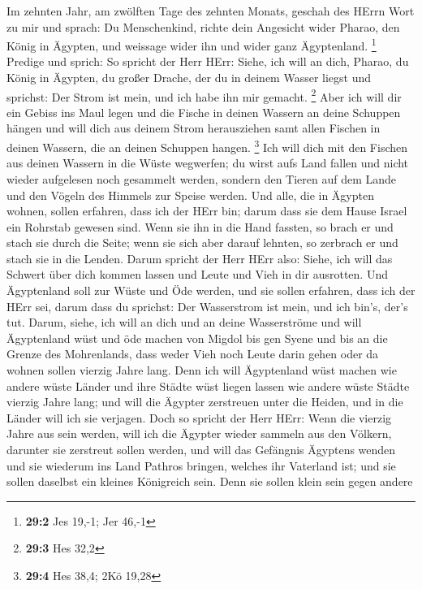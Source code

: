  Im zehnten Jahr, am zwölften Tage des zehnten Monats,
geschah des HErrn Wort zu mir und sprach:  Du
Menschenkind, richte dein Angesicht wider Pharao, den König in Ägypten,
und weissage wider ihn und wider ganz Ägyptenland. \footnote{\textbf{29:2}
  Jes 19,-1; Jer 46,-1}  Predige und sprich: So spricht
der Herr HErr: Siehe, ich will an dich, Pharao, du König in Ägypten, du
großer Drache, der du in deinem Wasser liegst und sprichst: Der Strom
ist mein, und ich habe ihn mir gemacht. \footnote{\textbf{29:3} Hes 32,2}
 Aber ich will dir ein Gebiss ins Maul legen und die
Fische in deinen Wassern an deine Schuppen hängen und will dich aus
deinem Strom herausziehen samt allen Fischen in deinen Wassern, die an
deinen Schuppen hangen. \footnote{\textbf{29:4} Hes 38,4; 2Kö 19,28}
 Ich will dich mit den Fischen aus deinen Wassern in die
Wüste wegwerfen; du wirst aufs Land fallen und nicht wieder aufgelesen
noch gesammelt werden, sondern den Tieren auf dem Lande und den Vögeln
des Himmels zur Speise werden.  Und alle, die in Ägypten
wohnen, sollen erfahren, dass ich der HErr bin; darum dass sie dem Hause
Israel ein Rohrstab gewesen sind.  Wenn sie ihn in die
Hand fassten, so brach er und stach sie durch die Seite; wenn sie sich
aber darauf lehnten, so zerbrach er und stach sie in die Lenden.
 Darum spricht der Herr HErr also: Siehe, ich will das
Schwert über dich kommen lassen und Leute und Vieh in dir ausrotten.
 Und Ägyptenland soll zur Wüste und Öde werden, und sie
sollen erfahren, dass ich der HErr sei, darum dass du sprichst: Der
Wasserstrom ist mein, und ich bin's, der's tut.  Darum,
siehe, ich will an dich und an deine Wasserströme und will Ägyptenland
wüst und öde machen von Migdol bis gen Syene und bis an die Grenze des
Mohrenlands,  dass weder Vieh noch Leute darin gehen oder
da wohnen sollen vierzig Jahre lang.  Denn ich will
Ägyptenland wüst machen wie andere wüste Länder und ihre Städte wüst
liegen lassen wie andere wüste Städte vierzig Jahre lang; und will die
Ägypter zerstreuen unter die Heiden, und in die Länder will ich sie
verjagen.  Doch so spricht der Herr HErr: Wenn die
vierzig Jahre aus sein werden, will ich die Ägypter wieder sammeln aus
den Völkern, darunter sie zerstreut sollen werden,  und
will das Gefängnis Ägyptens wenden und sie wiederum ins Land Pathros
bringen, welches ihr Vaterland ist; und sie sollen daselbst ein kleines
Königreich sein.  Denn sie sollen klein sein gegen andere
